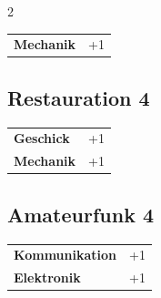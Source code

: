 \begin{multicols}{2}
\begin{tcolorbox}
\begin{tabular}{@{}ll@{}}
    \textbf{Mechanik} & +1\\
\end{tabular}


\end{tcolorbox}

\begin{tcolorbox}
    \subsection*{Restauration \hfill \small{4 }}
    \tcblower




\begin{tabular}{@{}ll@{}}
    \textbf{Geschick} & +1\\
    \textbf{Mechanik} & +1\\
\end{tabular}


\end{tcolorbox}

\begin{tcolorbox}
    \subsection*{Amateurfunk \hfill \small{4 }}
    \tcblower




\begin{tabular}{@{}ll@{}}
    \textbf{Kommunikation} & +1\\
    \textbf{Elektronik} & +1\\
\end{tabular}



\end{tcolorbox}
\end{multicols}
